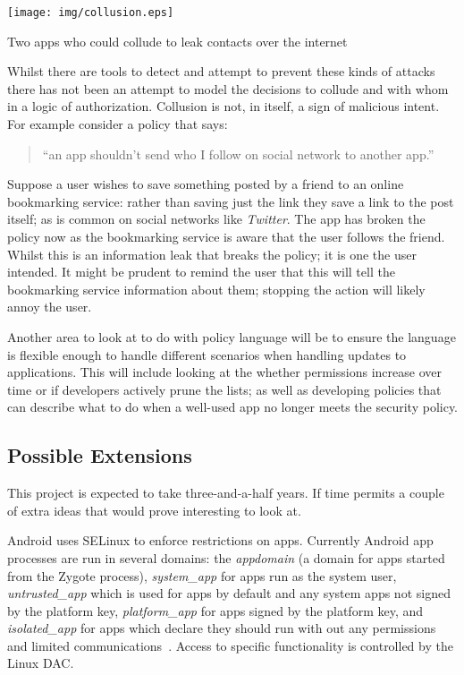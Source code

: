 \documentclass[a4paper]{article}
\begin{document}
\begin{marginfigure}
  \texttt{[image: img/collusion.eps]}
  \caption{Two apps who could collude to leak contacts over the internet}
  \label{fig:collude}
\end{marginfigure}

Whilst there are tools to detect and attempt to prevent these kinds of attacks
there has not been an attempt to model the decisions to collude and with whom in
a logic of authorization.  Collusion is not, in itself, a sign of malicious
intent.  For example consider a policy that says:
\begin{quote}
  ``an app shouldn't send who I follow on social network to another app.''
\end{quote}
Suppose a user wishes to save something posted by a friend to an online
bookmarking service: rather than saving just the link they save a link to the
post itself; as is common on social networks like \emph{Twitter}.  The app has
broken the policy now as the bookmarking service is aware that the user follows
the friend.  Whilst this is an information leak that breaks the policy; it is
one the user intended.  It might be prudent to remind the user that this will
tell the bookmarking service information about them; stopping the action
will likely annoy the user.

Another area to look at to do with policy language will be to ensure the language
is flexible enough to handle different scenarios when handling updates to
applications.  This will include looking at the whether permissions increase
over time or if developers actively prune the lists; as well as developing
policies that can describe what to do when a well-used app no longer meets the
security policy.  



\subsection{Possible Extensions}

This project is expected to take three-and-a-half years.  If time permits a
couple of extra ideas that would prove interesting to look at.

Android uses SELinux to enforce restrictions on apps.  Currently Android app
processes are run in several domains: the \emph{appdomain} (a domain for apps
started from the Zygote process), \emph{system\_app} for apps run as the system
user, \emph{untrusted\_app} which is used for apps by default and any system
apps not signed by the platform key, \emph{platform\_app} for apps signed by the
platform key, and \emph{isolated\_app} for apps which declare they should run
with out any permissions and limited communications~\cite{google:sepolicy}.
Access to specific functionality is controlled by the Linux \ac{DAC}.
\end{document}
